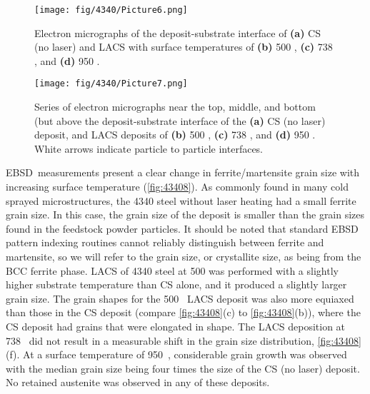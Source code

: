 \begin{figure}
	\centering
	\texttt{[image: fig/4340/Picture6.png]}
	\caption{Electron micrographs of the deposit-substrate interface of \textbf{(a)} CS (no laser) and LACS with surface temperatures of \textbf{(b)} 500 \celsius{}, \textbf{(c)} 738 \celsius{}, and \textbf{(d)} 950 \celsius{}.}
	\label{fig:43406}
\end{figure}


\begin{figure}
	\centering
	\texttt{[image: fig/4340/Picture7.png]}
	\caption[Series of electron micrographs near the top, middle, and bottom (but above the deposit-substrate interface) of the \textbf{(a)} CS (no laser) deposit, and LACS deposits of \textbf{(b)} 500 \celsius{}, \textbf{(c)} 738 \celsius{}, and \textbf{(d)} 950 \celsius{}.]{Series of electron micrographs near the top, middle, and bottom (but above the deposit-substrate interface of the \textbf{(a)} CS (no laser) deposit, and LACS deposits of \textbf{(b)} 500 \celsius{}, \textbf{(c)} 738 \celsius{}, and \textbf{(d)} 950 \celsius{}. White arrows indicate particle to particle interfaces.}
	\label{fig:43407}
\end{figure}



EBSD\ measurements present a clear change in ferrite/martensite grain size with increasing surface temperature (\ref{fig:43408}). As commonly found in many cold sprayed microstructures, the 4340 steel without laser heating had a small ferrite grain size. In this case, the grain size of the deposit is smaller than the grain sizes found in the feedstock powder particles. It should be noted that standard EBSD pattern indexing routines cannot reliably distinguish between ferrite and martensite, so we will refer to the grain size, or crystallite size, as being from the BCC ferrite phase.  LACS of 4340 steel at 500 \celsius{} was performed with a slightly higher substrate temperature than CS alone, and it produced a slightly larger grain size. The grain shapes for the 500 \celsius{} LACS deposit was also more equiaxed than those in the CS deposit (compare \ref{fig:43408}(c) to \ref{fig:43408}(b)), where the CS deposit had grains that were elongated in shape. The LACS deposition at 738 \celsius{} did not result in a measurable shift in the grain size distribution, \ref{fig:43408}(f). At a surface temperature of 950 \celsius{}, considerable grain growth was observed with the median grain size being four times the size of the CS (no laser) deposit. No retained austenite was observed in any of these deposits. 


